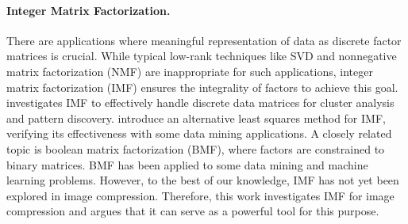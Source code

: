\paragraph{Integer Matrix Factorization.} 
There are applications where meaningful representation of data as discrete factor matrices is crucial. While typical low-rank techniques like SVD and nonnegative matrix factorization (NMF) are inappropriate for such applications, integer matrix factorization (IMF) ensures the integrality of factors to achieve this goal. \citet{lin2005integer} investigates IMF to effectively handle discrete data matrices for cluster analysis and pattern discovery. \citet{dong2018integer} introduce an alternative least squares method for IMF, verifying its effectiveness with some data mining applications. A closely related topic is boolean matrix factorization (BMF), where factors are constrained to binary matrices. BMF has been applied to some data mining \cite{miettinen2008discrete} and machine learning \cite{ravanbakhsh2016boolean} problems. However, to the best of our knowledge, IMF has not yet been explored in image compression. Therefore, this work investigates IMF for image compression and argues that it can serve as a powerful tool for this purpose.
